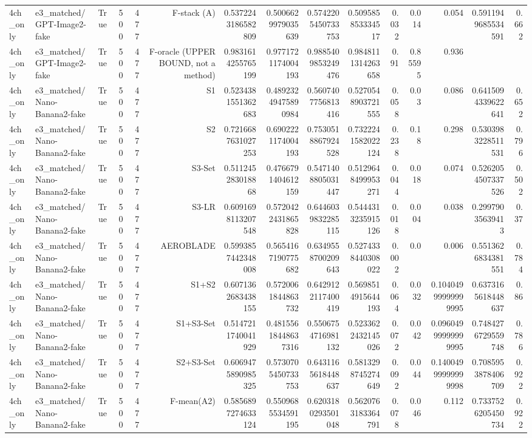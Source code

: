 \begin{table}[htbp]
\begin{tabular}{llrrrrrrrrrrrrr}
4ch\_only & e3\_matched/GPT-Image2-fake & True & 500 & 477 & F-stack (A) & 0.5372243186582809 & 0.5006629979035639 & 0.5742205450733753 & 0.509585853334517 & 0.032 & 0.014 & 0.054 & 0.5911949685534591 & 0.662 \\
4ch\_only & e3\_matched/GPT-Image2-fake & True & 500 & 477 & F-oracle (UPPER BOUND, not a method) & 0.9831614255765199 & 0.9771721174004193 & 0.9885409853249476 & 0.9848111314263658 & 0.91 & 0.85595 & 0.936 &  &  \\
4ch\_only & e3\_matched/Nano-Banana2-fake & True & 500 & 477 & S1 & 0.5234381551362683 & 0.48923249475890984 & 0.5607407756813416 & 0.5270548903721555 & 0.058 & 0.03 & 0.086 & 0.6415094339622641 & 0.652 \\
4ch\_only & e3\_matched/Nano-Banana2-fake & True & 500 & 477 & S2 & 0.7216687631027253 & 0.6902221174004193 & 0.7530518867924528 & 0.7322241582022124 & 0.238 & 0.18 & 0.298 & 0.5303983228511531 & 0.796 \\
4ch\_only & e3\_matched/Nano-Banana2-fake & True & 500 & 477 & S3-Set & 0.511245283018868 & 0.4766791404612159 & 0.5471408805031447 & 0.5129648499953271 & 0.044 & 0.018 & 0.074 & 0.5262054507337526 & 0.502 \\
4ch\_only & e3\_matched/Nano-Banana2-fake & True & 500 & 477 & S3-LR & 0.6091698113207548 & 0.5720422431865828 & 0.6446039832285115 & 0.5444313235915126 & 0.018 & 0.004 & 0.038 & 0.29979035639413 & 0.37 \\
4ch\_only & e3\_matched/Nano-Banana2-fake & True & 500 & 477 & AEROBLADE & 0.5993857442348008 & 0.5654167190775682 & 0.6349558700209643 & 0.5274338440308022 & 0.002 & 0.0 & 0.006 & 0.5513626834381551 & 0.784 \\
4ch\_only & e3\_matched/Nano-Banana2-fake & True & 500 & 477 & S1+S2 & 0.6071362683438155 & 0.5720061844863732 & 0.6429122117400419 & 0.5698514915644193 & 0.064 & 0.032 & 0.10404999999999995 & 0.6373165618448637 & 0.86 \\
4ch\_only & e3\_matched/Nano-Banana2-fake & True & 500 & 477 & S1+S3-Set & 0.5147211740041929 & 0.48155618448637316 & 0.5506754716981132 & 0.5233622432145026 & 0.072 & 0.042 & 0.09604999999999995 & 0.7484276729559748 & 0.786 \\
4ch\_only & e3\_matched/Nano-Banana2-fake & True & 500 & 477 & S2+S3-Set & 0.6069475890985325 & 0.5730705450733753 & 0.6431165618448637 & 0.5813298745274649 & 0.092 & 0.044 & 0.14004999999999998 & 0.7085953878406709 & 0.922 \\
4ch\_only & e3\_matched/Nano-Banana2-fake & True & 500 & 477 & F-mean(A2) & 0.5856897274633124 & 0.5509685534591195 & 0.6203180293501048 & 0.5620763183364791 & 0.078 & 0.046 & 0.112 & 0.7337526205450734 & 0.922 \\

\end{tabular}
\end{table}
